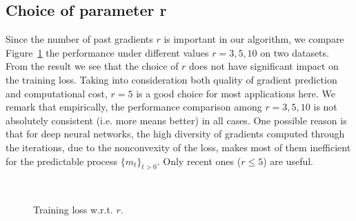 \documentclass[11pt]{article}
\theoremstyle{k}
\begin{document}
\subsection{Choice of parameter r}\label{sec:choicer}

Since the number of past gradients $r$ is important in our algorithm, we compare Figure~\ref{fig:compare} the performance under different values $r=3,5,10$ on two datasets. 
From the result we see that the choice of $r$ does not have significant impact on the training loss.
Taking into consideration both quality of gradient prediction and computational cost, $r=5$ is a good choice for most applications here. 
We remark that empirically, the performance comparison among $r=3,5,10$ is not absolutely consistent (i.e. more means better) in all cases. 
One possible reason is that for deep neural networks, the high diversity of gradients computed through the iterations, due to the nonconvexity of the loss, makes most of them inefficient for the predictable process $\{m_t\}_{t>0}$. Only recent ones ($r \leq 5$) are useful.\vspace{-0.1in}

\begin{figure}[H]
\centering
\mbox{
}
\caption{Training loss w.r.t. $r$.}\label{fig:compare}
\end{figure}
\end{document}
